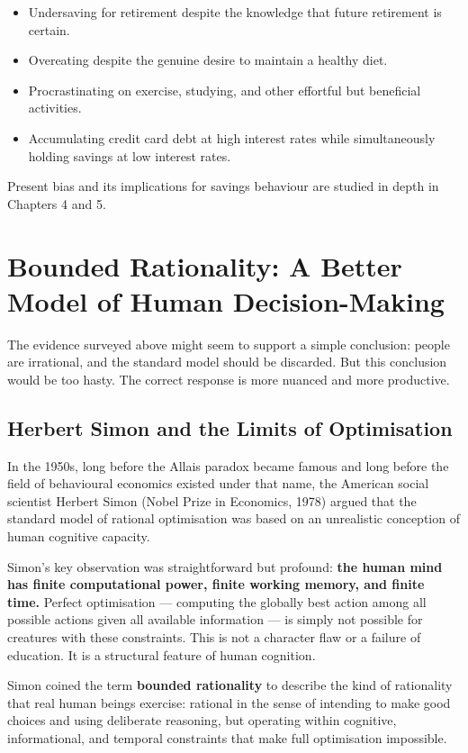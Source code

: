 \documentclass[12pt, letterpaper]{article}
\begin{document}
\begin{itemize}
\item Undersaving for retirement despite the knowledge that future retirement is certain.
\item Overeating despite the genuine desire to maintain a healthy diet.
\item Procrastinating on exercise, studying, and other effortful but beneficial activities.
\item Accumulating credit card debt at high interest rates while simultaneously holding savings at low interest rates.
\end{itemize}

Present bias and its implications for savings behaviour are studied in depth in Chapters 4 and 5.

\medskip


\section{Bounded Rationality: A Better Model of Human Decision-Making}


The evidence surveyed above might seem to support a simple conclusion: people are irrational, and the standard model should be discarded. But this conclusion would be too hasty. The correct response is more nuanced and more productive.


\subsection{Herbert Simon and the Limits of Optimisation}


In the 1950s, long before the Allais paradox became famous and long before the field of behavioural economics existed under that name, the American social scientist Herbert Simon (Nobel Prize in Economics, 1978) argued that the standard model of rational optimisation was based on an unrealistic conception of human cognitive capacity.

Simon's key observation was straightforward but profound: \textbf{the human mind has finite computational power, finite working memory, and finite time.} Perfect optimisation --- computing the globally best action among all possible actions given all available information --- is simply not possible for creatures with these constraints. This is not a character flaw or a failure of education. It is a structural feature of human cognition.

Simon coined the term \textbf{bounded rationality} to describe the kind of rationality that real human beings exercise: rational in the sense of intending to make good choices and using deliberate reasoning, but operating within cognitive, informational, and temporal constraints that make full optimisation impossible.
\end{document}
